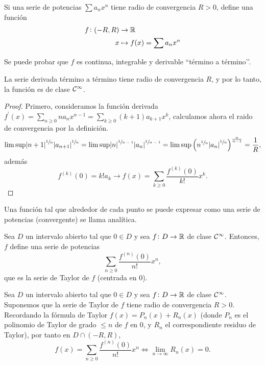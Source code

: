\begin{defi}
    Si una serie de potencias $\sum a_n x^n$ tiene radio de convergencia $R > 0$,
    define una función
    \[\begin{aligned}
        f \colon (-R,R) &\to \mathbb{R} \\ x &\mapsto f(x) = \sum a_n x^n
    \end{aligned}\]
\end{defi}

\begin{obs*}
    Se puede probar que $f$ es continua, integrable y derivable
    ``término a término’’.
\end{obs*}

\begin{obs*}
    La serie derivada término a término tiene radio de convergencia $R$, y por
    lo tanto, la función es de clase $\mathcal{C}^\infty$.
\end{obs*}

\begin{proof}
    Primero, consideramos la función derivada $f^\prime (x) = \sum\limits_{n \geq 0}
    n a_n x^{n-1} = \sum\limits_{k \geq 0} (k+1) a_{k+1} x^k$, calculamos ahora
    el raido de convergencia por la definición.
    \[
        \limsup \abs{n+1}^{\sfrac{1}{n}}\abs{a_{n+1}}^{\sfrac{1}{n}} =
        \limsup \abs{n}^{\sfrac{1}{n-1}}\abs{a_{n}}^{\sfrac{1}{n-1}} =
        \limsup \left( n^{\sfrac{1}{n}} \abs{a_n}^{\sfrac{1}{n}} \right)^
        {\frac{n}{n-1}} = \frac{1}{R},
    \]
    además
    \[
        f^{(k)}(0) = k! a_k \rightarrow f(x) = \sum_{k \geq 0} \frac{f^{(k)}(0)}
        {k!}x^k.
    \]
\end{proof}

\begin{defi*}
    Una función tal que alrededor de cada punto se puede expresar como una serie
    de potencias (convergente) se llama analítica.
\end{defi*}

\begin{defi}
    Sea $D$ un intervalo abierto tal que $0 \in D$ y sea $f \colon D \to \mathbb{R}$
    de clase $\mathcal{C}^\infty$. Entonces, $f$ define una serie de potencias
    \[
        \sum_{n \geq 0} \frac{f^{(n)}(0)}{n!} x^n,
    \]
    que es la serie de Taylor de $f$ (centrada en 0).
\end{defi}

\begin{prop*}
    Sea $D$ un intervalo abierto tal que $0 \in D$ y sea $f \colon D \to \mathbb{R}$
    de clase $\mathcal{C}^\infty$. Suponemos que la serie de Taylor de $f$ tiene radio
    de convergencia $R > 0$. Recordando la fórmula de Taylor $f(x) = P_n(x) + R_n(x)$
    (donde $P_n$ es el polinomio de Taylor de grado $\leq n$ de $f$ en 0, y $R_n$
    el correspondiente residuo de Taylor), por tanto en $D \cap (-R,R)$,
    \[
        f(x) = \sum_{n \geq 0} \frac{f^{(n)}(0)}{n!}x^n \iff
        \lim_{n \to \infty} R_n(x) = 0.
    \]
\end{prop*}


